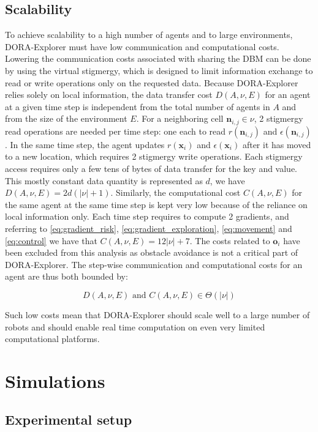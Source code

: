 \subsection{Scalability}
\label{subsec:scalability}
To achieve scalability to a high number of agents and to large
environments, DORA-Explorer must have low communication and computational costs. Lowering the communication costs associated
with sharing the DBM can be done by using the virtual
stigmergy, which is designed to limit information exchange to read or
write operations only on the requested data. Because DORA-Explorer relies
solely on local information, the data transfer cost $D(A, \nu, E)$ for
an agent at a given time step is independent from the total number of
agents in $A$ and from the size of the environment $E$. For a
neighboring cell $\bm{n}_{i,j} \in \nu$, 2 stigmergy read operations
are needed per time step: one each to read $r(\bm{n}_{i,j})$ and
$\epsilon(\bm{n}_{i,j})$. In the same time step, the agent updates
$r(\bm{x}_i)$ and $\epsilon(\bm{x}_i)$ after it has moved to a new
location, which requires 2 stigmergy write operations. Each stigmergy
access requires only a few tens of bytes of data transfer for the key
and value. This mostly constant data quantity is represented as $d$,
we have $D(A, \nu, E) = 2d(|\nu| + 1)$. Similarly, the computational
cost $C(A, \nu, E)$ for the same agent at the same time step is kept
very low because of the reliance on local information only. Each time
step requires to compute 2 gradients, and referring to
\eqref{eq:gradient_risk}, \eqref{eq:gradient_exploration}, \eqref{eq:movement} and
\eqref{eq:control} we have that $C(A, \nu, E) = 12|\nu|+7$. The costs
related to $\bm{o}_i$ have been excluded from this analysis as
obstacle avoidance is not a critical part of DORA-Explorer. The step-wise communication
and computational costs for an agent are thus
both bounded by:

\begin{equation}
    D(A, \nu, E) \text{ and } C(A, \nu, E) \in \Theta(|\nu|)
    \label{eq:costs}
\end{equation}

Such low costs mean that DORA-Explorer should scale well to a large number of
robots and should enable real time computation on even very limited computational platforms.


\section{Simulations}
\subsection{Experimental setup}
\label{experimentSetup}

